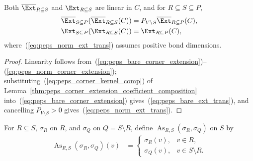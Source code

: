 \begin{lemma}
    \label{thm:peps_corner_extension_linear_transitive}
    \leanok
    Both $\overline{\Ext}_{R\subseteq S}$ and $\Ext_{R\subseteq S}$ are linear
    in $C$, and for $R\subseteq S\subseteq P$,
    \begin{align}
        \overline{\Ext}_{S\subseteq P}
        (\overline{\Ext}_{R\subseteq S}(C))
         & =
        P_{V\setminus S}
        \overline{\Ext}_{R\subseteq P}(C),
        \label{eq:peps_bare_ext_trans} \\
        \Ext_{S\subseteq P}
        (\Ext_{R\subseteq S}(C))
         & =
        \Ext_{R\subseteq P}(C),
        \label{eq:peps_norm_ext_trans}
    \end{align}
    where~(\ref{eq:peps_norm_ext_trans}) assumes positive bond dimensions.
\end{lemma}
\begin{proof}\leanok
    Linearity follows from~(\ref{eq:peps_bare_corner_extension})--(\ref{eq:peps_norm_corner_extension});
    substituting~(\ref{eq:peps_corner_kernel_comp}) of
    Lemma~\ref{thm:peps_corner_extension_coefficient_composition} into~(\ref{eq:peps_bare_corner_extension})
    gives~(\ref{eq:peps_bare_ext_trans}), and cancelling $P_{V\setminus S}>0$
    gives~(\ref{eq:peps_norm_ext_trans}).
\end{proof}

\begin{definition}
    \label{def:peps_assemble_subregion_physical_config}
    \leanok
    For $R\subseteq S$, $\sigma_R$ on $R$, and $\sigma_Q$ on $Q=S\setminus R$,
    define $\operatorname{As}_{R,S}(\sigma_R,\sigma_Q)$ on $S$ by
    \begin{align}
        \operatorname{As}_{R,S}(\sigma_R,\sigma_Q)(v)
         & =
        \begin{cases}
            \sigma_R(v), & v\in R,            \\
            \sigma_Q(v), & v\in S\setminus R.
        \end{cases}
        \label{eq:peps_assemble_subregion_config}
    \end{align}
\end{definition}

